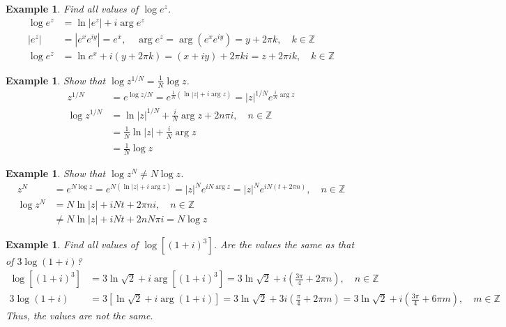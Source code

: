 \documentclass{article}
\newtheorem{example}[theorem]{Example}
\theoremstyle{definition}
\begin{document}
\begin{example} \normalfont
    Find all values of $\log e^z$.
    \begin{align*}
        \log e^z &= \ln |e^z| + i \arg e^z \\
        |e^z| &= |e^x e^{iy}| = e^x, \quad \arg e^z = \arg (e^x e^{iy}) = y + 2 \pi k, \quad k \in \mathbb{Z} \\
        \log e^z &= \ln e^x + i (y + 2 \pi k) = (x + iy) + 2\pi k i = z + 2 \pi i k, \quad k \in \mathbb{Z}
    \end{align*}
\end{example}

\begin{example} \normalfont
    Show that $\log z^{1/N} = \frac{1}{N} \log z$.
    \begin{align*}
        z^{1/N} &= e^{\log z / N} = e^{\frac{1}{N} (\ln |z| + i \arg z)} = |z|^{1/N} e^{\frac{i}{N} \arg z} \\
        \log z^{1/N} &= \ln |z|^{1/N} + \frac{i}{N} \arg z + 2n \pi i, \quad n \in \mathbb{Z} \\
        &= \frac{1}{N} \ln |z| + \frac{i}{N} \arg z \\
        &= \frac{1}{N} \log z
    \end{align*}
\end{example}

\begin{example} \normalfont
    Show that $\log z^N \neq N \log z$.
    \begin{align*}
        z^N &= e^{N \log z} = e^{N (\ln |z| + i \arg z)} = |z|^N e^{i N \arg z} = |z|^N e^{iN(t + 2 \pi n)}, \quad n \in \mathbb{Z} \\
        \log z^N &= N \ln |z| + i Nt + 2 \pi n i, \quad n \in \mathbb{Z} \\
        &\neq N \ln |z| + i Nt + 2n N \pi i = N \log z
    \end{align*}
\end{example}

\begin{example} \normalfont
    Find all values of $\log[(1+i)^3]$. Are the values the same as that of $3 \log(1+i)$?
    \begin{align*}
        \log[(1+i)^3] &= 3 \ln \sqrt{2} + i \arg [(1+i)^3] = 3 \ln \sqrt{2} + i \left( \frac{3\pi}{4} + 2 \pi n \right), \quad n \in \mathbb{Z} \\
        3 \log(1+i) &= 3 [\ln \sqrt{2} + i \arg (1 + i)] = 3 \ln \sqrt{2} + 3i \left( \frac{\pi}{4} + 2 \pi m \right) = 3 \ln \sqrt{2} + i \left( \frac{3 \pi}{4} + 6 \pi m \right), \quad m \in \mathbb{Z}
    \end{align*}
    Thus, the values are not the same.
\end{example}
\end{document}
